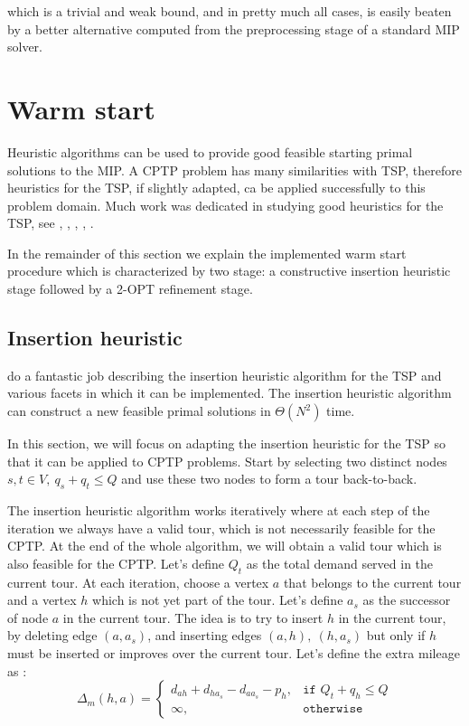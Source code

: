 which is a trivial and weak bound, and in pretty much all cases, is easily beaten by a better alternative computed from the preprocessing stage of a standard MIP solver.

\section{Warm start}

Heuristic algorithms can be used to provide good feasible starting primal solutions to the MIP.
A CPTP problem has many similarities with TSP, therefore heuristics for the TSP, if slightly adapted, ca be applied successfully to this problem domain.
Much work was dedicated in studying good heuristics for the TSP, see \cite{rosenkrantz_analysis_1977}, \cite{johnson_traveling_1997}, \cite{laporte_traveling_1992}, \cite{johnson_experimental_2007}, \cite{hoffman_traveling_2013}.

In the remainder of this section we explain the implemented warm start procedure which is characterized by two stage: a constructive insertion heuristic stage followed by a 2-OPT refinement stage.

\subsection{Insertion heuristic}
\cite{rosenkrantz_analysis_1977} do a fantastic job describing the insertion heuristic algorithm for the TSP and various facets in which it can be implemented.
The insertion heuristic algorithm can construct a new feasible primal solutions in $\Theta(N^2)$ time.

In this section, we will focus on adapting the insertion heuristic for the TSP so that it can be applied to CPTP problems.
Start by selecting two distinct nodes $s, t \in V,\ q_s + q_t \le Q$ and use these two nodes to form a tour back-to-back.

The insertion heuristic algorithm works iteratively where at each step of the iteration we always have a valid tour, which is not necessarily feasible for the CPTP.
At the end of the whole algorithm, we will obtain a valid tour which is also feasible for the CPTP.
Let's define $Q_t$ as the total demand served in the current tour.
At each iteration, choose a vertex $a$ that belongs to the current tour and a vertex $h$ which is not yet part of the tour.
Let's define $a_s$ as the successor of node $a$ in the current tour.
The idea is to try to insert $h$ in the current tour, by deleting edge $(a, a_s)$, and inserting edges $(a, h),\ (h, a_s)$ but only if $h$ must be inserted or improves over the current tour.
Let's define the extra mileage as
:
\begin{equation}
	\Delta_m(h, a) =
	\begin{cases}
		d_{ah} + d_{ha_s} - d_{aa_s} - p_h, & \texttt{if } Q_t + q_h \le Q \\
		\infty,                             & \texttt{otherwise}
	\end{cases}
\end{equation}

